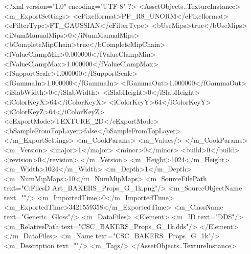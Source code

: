 <?xml version="1.0" encoding="UTF-8" ?>
<AssetObjects..TextureInstance>
	<m_ExportSettings>
		<ePixelformat>PF_R8_UNORM</ePixelformat>
		<eFilterType>FT_GAUSSIAN</eFilterType>
		<bUseMips>true</bUseMips>
		<iNumManualMips>0</iNumManualMips>
		<bCompleteMipChain>true</bCompleteMipChain>
		<fValueClampMin>0.000000</fValueClampMin>
		<fValueClampMax>1.000000</fValueClampMax>
		<fSupportScale>1.000000</fSupportScale>
		<fGammaIn>1.000000</fGammaIn>
		<fGammaOut>1.000000</fGammaOut>
		<iSlabWidth>0</iSlabWidth>
		<iSlabHeight>0</iSlabHeight>
		<iColorKeyX>64</iColorKeyX>
		<iColorKeyY>64</iColorKeyY>
		<iColorKeyZ>64</iColorKeyZ>
		<eExportMode>TEXTURE_2D</eExportMode>
		<bSampleFromTopLayer>false</bSampleFromTopLayer>
	</m_ExportSettings>
	<m_CookParams>
		<m_Values/>
	</m_CookParams>
	<m_Version>
		<major>1</major>
		<minor>0</minor>
		<build>0</build>
		<revision>0</revision>
	</m_Version>
	<m_Height>1024</m_Height>
	<m_Width>1024</m_Width>
	<m_Depth>1</m_Depth>
	<m_NumMipMaps>10</m_NumMipMaps>
	<m_SourceFilePath text="C:\Users\Shadow\Desktop\Working Files\3D Art\Textures\CSC_BAKERS_Props_G_1k.png"/>
	<m_SourceObjectName text=""/>
	<m_ImportedTime>0</m_ImportedTime>
	<m_ExportedTime>3421559358</m_ExportedTime>
	<m_ClassName text="Generic_Gloss"/>
	<m_DataFiles>
		<Element>
			<m_ID text="DDS"/>
			<m_RelativePath text="CSC_BAKERS_Props_G_1k.dds"/>
		</Element>
	</m_DataFiles>
	<m_Name text="CSC_BAKERS_Props_G_1k"/>
	<m_Description text=""/>
	<m_Tags/>
</AssetObjects..TextureInstance>

